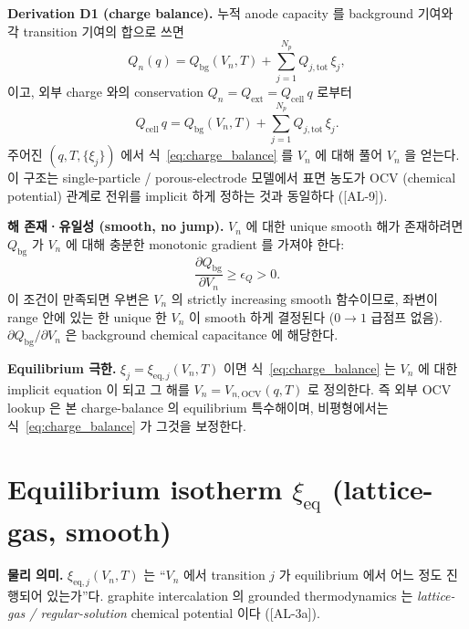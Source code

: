 \documentclass[11pt,a4paper]{article}
\newcommand{\eq}{\mathrm{eq}}
\newcommand{\OCV}{\mathrm{OCV}}
\newcommand{\tot}{\mathrm{tot}}
\newcommand{\bg}{\mathrm{bg}}
\newcommand{\cell}{\mathrm{cell}}
\newcommand{\ext}{\mathrm{ext}}
\newcommand{\AL}[1]{\textsf{[AL-#1]}}
\begin{document}
\textbf{Derivation D1 (charge balance).} 누적 anode capacity 를 background 기여와 각
transition 기여의 합으로 쓰면
\begin{equation}
Q_n(q) = Q_\bg(V_n,T) + \sum_{j=1}^{N_p} Q_{j,\tot}\,\xi_j,
\label{eq:Qn}
\end{equation}
이고, 외부 charge 와의 conservation $Q_n = Q_\ext = Q_\cell\,q$ 로부터
\begin{equation}
\boxed{\;Q_\cell\,q = Q_\bg(V_n,T) + \sum_{j=1}^{N_p} Q_{j,\tot}\,\xi_j.\;}
\label{eq:charge_balance}
\end{equation}
주어진 $(q,T,\{\xi_j\})$ 에서 식~\eqref{eq:charge_balance} 를 $V_n$ 에 대해 풀어 $V_n$
을 얻는다. 이 구조는 single-particle / porous-electrode 모델에서 표면 농도가 OCV
(chemical potential) 관계로 전위를 implicit 하게 정하는 것과 동일하다
\cite{doyle1993,newman} (\AL{9}).

\textbf{해 존재·유일성 (smooth, no jump).} $V_n$ 에 대한 unique smooth 해가 존재하려면
$Q_\bg$ 가 $V_n$ 에 대해 충분한 monotonic gradient 를 가져야 한다:
\begin{equation}
\frac{\partial Q_\bg}{\partial V_n} \ge \epsilon_Q > 0.
\label{eq:monotone}
\end{equation}
이 조건이 만족되면 우변은 $V_n$ 의 strictly increasing smooth 함수이므로, 좌변이
range 안에 있는 한 unique 한 $V_n$ 이 smooth 하게 결정된다 ($0\!\to\!1$ 급점프 없음).
$\partial Q_\bg/\partial V_n$ 은 background chemical capacitance 에 해당한다.

\textbf{Equilibrium 극한.} $\xi_j=\xi_{\eq,j}(V_n,T)$ 이면 식~\eqref{eq:charge_balance}
는 $V_n$ 에 대한 implicit equation 이 되고 그 해를 $V_n=V_{n,\OCV}(q,T)$ 로 정의한다.
즉 외부 OCV lookup 은 본 charge-balance 의 equilibrium 특수해이며, 비평형에서는
식~\eqref{eq:charge_balance} 가 그것을 보정한다.

\section{Equilibrium isotherm $\xi_\eq$ (lattice-gas, smooth)}\label{sec:equilibrium}
\textbf{물리 의미.} $\xi_{\eq,j}(V_n,T)$ 는 ``$V_n$ 에서 transition $j$ 가 equilibrium
에서 어느 정도 진행되어 있는가''다. graphite intercalation 의 grounded thermodynamics
는 \emph{lattice-gas / regular-solution} chemical potential 이다 \cite{mckinnon1983,
bazant2013} (\AL{3a}).
\end{document}
